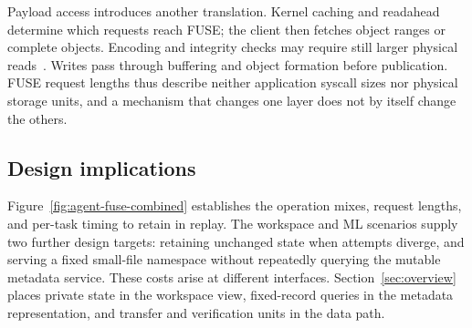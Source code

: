 Payload access introduces another translation. Kernel caching and
readahead determine which requests reach FUSE; the client then fetches
object ranges or complete objects. Encoding and integrity checks may
require still larger physical reads~\cite{azureec2012,okapi2025}. Writes
pass through buffering and object formation before publication. FUSE
request lengths thus describe neither application syscall sizes nor
physical storage units, and a mechanism that changes one layer does not
by itself change the others.



\subsection{Design implications}

Figure~\ref{fig:agent-fuse-combined} establishes the operation mixes,
request lengths, and per-task timing to retain in replay. The workspace
and ML scenarios supply two further design targets: retaining unchanged
state when attempts diverge, and serving a fixed small-file namespace
without repeatedly querying the mutable metadata service. These costs
arise at different interfaces. Section~\ref{sec:overview} places private
state in the workspace view, fixed-record queries in the metadata
representation, and transfer and verification units in the data path.
